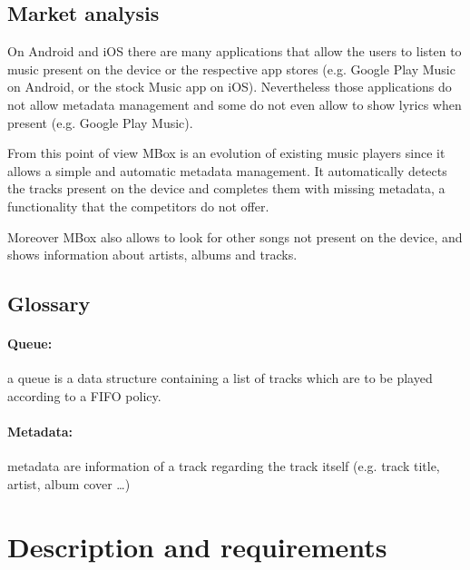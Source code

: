 \documentclass{article}
\begin{document}
\subsection{Market analysis}
On Android and iOS there are many applications that allow the users to listen to
music present on the device or the respective app stores (e.g. Google Play Music
on Android, or the stock Music app on iOS). Nevertheless those applications do
not allow metadata management and some do not even allow to show lyrics when
present (e.g. Google Play Music).

From this point of view MBox is an evolution of existing music players since it
allows a simple and automatic metadata management. It automatically detects the
tracks present on the device and completes them with missing metadata,
a functionality that the competitors do not offer.

Moreover MBox also allows to look for other songs not present on the device, and
shows information about artists, albums and tracks.


\subsection{Glossary}
\paragraph{Queue:} a queue is a data structure containing a list of tracks
which are to be played according to a FIFO policy.
\paragraph{Metadata: } metadata are information of a track regarding the track
itself (e.g. track title, artist, album cover \ldots)

\newpage

\section{Description and requirements}
\end{document}
